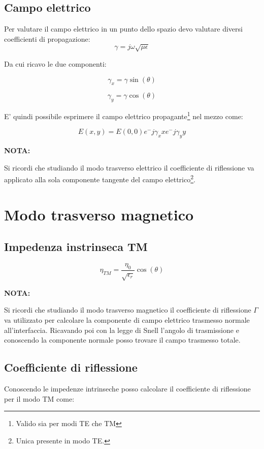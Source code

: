 \documentclass[10pt,a4paper]{report}
\begin{document}
		\subsection{Campo elettrico}

			Per valutare il campo elettrico in un punto dello spazio devo valutare diversi coefficienti di propagazione:
			\[
			\gamma=j\omega\sqrt{\mu\epsilon}\]

			Da cui ricavo le due componenti:

			\[
			\gamma_x=\gamma\sin(\theta)
			\]

			\[
			\gamma_y=\gamma\cos(\theta)
			\]

			E' quindi possibile esprimere il campo elettrico propagante\footnote{Valido sia per modi TE che TM} nel mezzo come:
			
			\[
			E(x,y)=E(0,0)e^-{j\gamma_x x}e^-{j\gamma_y y}
			\]
		
			\textbf{NOTA:}

			Si ricordi che studiando il modo trasverso elettrico il coefficiente di riflessione va applicato alla sola componente tangente del campo elettrico\footnote{Unica presente in modo TE.}.
			
	\section{Modo trasverso magnetico}

			\subsection{Impedenza instrinseca TM}

				\begin{equation}
					\eta_{TM}=\frac{\eta_0}{\sqrt{\epsilon_r}}\cos(\theta)
				\end{equation}

			\textbf{NOTA:}

			Si ricordi che studiando il modo trasverso magnetico il coefficiente di riflessione $\Gamma$ va utilizzato per calcolare la componente di campo elettrico trasmesso normale all'interfaccia.
			Ricavando poi con la legge di Snell l'angolo di trasmissione e conoscendo la componente normale posso trovare il campo trasmesso totale.

		\subsection{Coefficiente di riflessione}
			Conoscendo le impedenze intrinseche posso calcolare il coefficiente di riflessione per il modo TM come:
\end{document}
